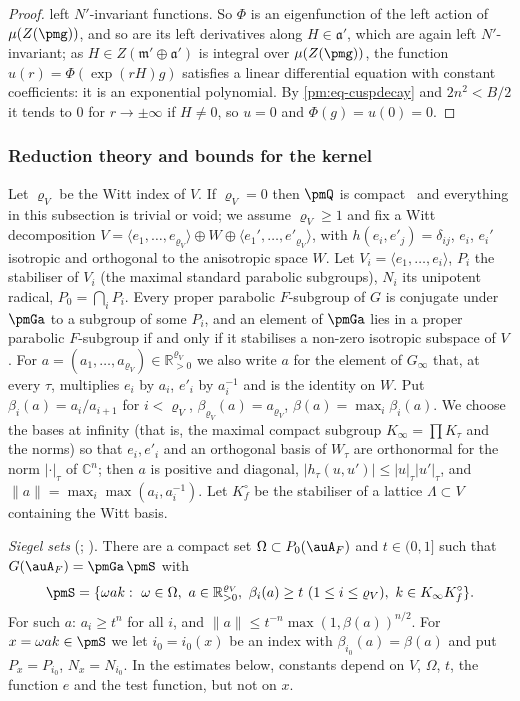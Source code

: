 \documentclass[10pt]{amsart}
\theoremstyle{definition}
\theoremstyle{remark}
\newcommand{\C}{\mathbb C}
\newcommand{\R}{\mathbb R}
\begin{document}
\begin{proof}
left $N'$-invariant functions. So $\Phi$ is an eigenfunction of the left action of
$\mu(Z(\pmg))$, and so are its left derivatives along $H\in\mathfrak a'$, which are again left
$N'$-invariant; as $H\in Z(\mathfrak m'\oplus\mathfrak a')$ is integral over $\mu(Z(\pmg))$, the
function $u(r)=\Phi(\exp(rH)g)$ satisfies a linear differential equation with constant
coefficients: it is an exponential polynomial. By \eqref{pm:eq-cuspdecay} and $2n^2<B/2$ it tends
to $0$ for $r\to\pm\infty$ if $H\ne0$, so $u=0$ and $\Phi(g)=u(0)=0$.
\end{proof}

\subsubsection{Reduction theory and bounds for the kernel}\label{pm:ss-bound}

Let $\varrho_V$ be the Witt index of $V$. If $\varrho_V=0$ then $\pmQ$ is compact~\cite[Theorem~5.6(ii)]{BorelFin} and
everything in this subsection is trivial or void; we assume $\varrho_V\ge1$ and fix a Witt
decomposition $V=\langle e_1,\dots,e_{\varrho_V}\rangle\oplus W\oplus\langle e_1',\dots,
e'_{\varrho_V}\rangle$, with $h(e_i,e'_j)=\delta_{ij}$, $e_i$, $e_i'$ isotropic and orthogonal to the
anisotropic space $W$. Let $V_i=\langle e_1,\dots,e_i\rangle$, $P_i$ the stabiliser of $V_i$ (the
maximal standard parabolic subgroups), $N_i$ its unipotent radical, $P_0=\bigcap_iP_i$. Every proper
parabolic $F$-subgroup of $G$ is conjugate under $\pmGa$ to a subgroup of some $P_i$, and an element
of $\pmGa$ lies in a proper parabolic $F$-subgroup if and only if it stabilises a non-zero isotropic
subspace of $V$. For $a=(a_1,\dots,a_{\varrho_V})\in\R_{>0}^{\varrho_V}$ we also write $a$ for the
element of $G_\infty$ that, at every $\tau$, multiplies $e_i$ by $a_i$, $e'_i$ by $a_i^{-1}$ and is
the identity on $W$. Put $\beta_i(a)=a_i/a_{i+1}$ for $i<\varrho_V$, $\beta_{\varrho_V}(a)=
a_{\varrho_V}$, $\beta(a)=\max_i\beta_i(a)$. We choose the bases at infinity (that is, the maximal
compact subgroup $K_\infty=\prod K_\tau$ and the norms) so that $e_i,e'_i$ and an orthogonal basis
of $W_\tau$ are orthonormal for the norm $|\cdot|_\tau$ of $\C^n$; then $a$ is positive and
diagonal, $|h_\tau(u,u')|\le|u|_\tau|u'|_\tau$, and $\|a\|=\max_i\max(a_i,a_i^{-1})$. Let $K_f^\circ$
be the stabiliser of a lattice $\Lambda\subset V$ containing the Witt basis.

\emph{Siegel sets} (\cite[Th\'eor\`eme~7]{Godement63}; \cite[\S I.2.1, p.~20]{MW}). There are a compact set
$\Omega\subset P_0(\auA_F)$ and $t\in(0,1]$ such that $G(\auA_F)=\pmGa\,\pmS$ with
\[
\pmS=\{\omega ak:\ \omega\in\Omega,\ a\in\R_{>0}^{\varrho_V},\ \beta_i(a)\ge t\ (1\le i\le\varrho_V),\
k\in K_\infty K_f^\circ\}.
\]
For such $a$: $a_i\ge t^{n}$ for all $i$, and $\|a\|\le t^{-n}\max(1,\beta(a))^{n/2}$. For
$x=\omega ak\in\pmS$ we let $i_0=i_0(x)$ be an index with $\beta_{i_0}(a)=\beta(a)$ and put
$P_x=P_{i_0}$, $N_x=N_{i_0}$. In the estimates below, constants depend on $V$, $\Omega$, $t$, the
function $e$ and the test function, but not on $x$.
\end{document}
